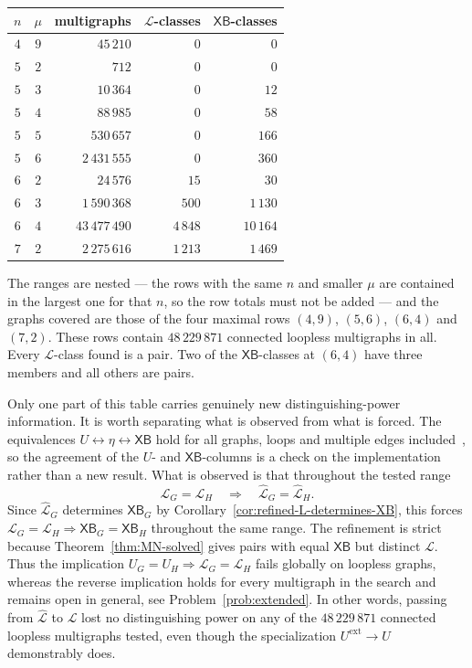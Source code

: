 \documentclass[11pt]{article}
\theoremstyle{plain}
\theoremstyle{definition}
\renewcommand{\mathcal}{\mathscr}
\newcommand{\LL}{\mathcal{L}}    %
\newcommand{\XB}{\mathsf{XB}} %
\newcommand{\ext}{\mathrm{ext}}
\numberwithin{equation}{section}
\begin{document}
\begin{center}
\begin{tabular}{ccrrr}
\toprule
$n$ & $\mu$ & multigraphs & $\LL$-classes & $\XB$-classes\\
\midrule
$4$    & $9$    & $45\,210$    & $0$   & $0$\\
$5$    & $2$    & $712$        & $0$   & $0$\\
$5$    & $3$    & $10\,364$    & $0$   & $12$\\
$5$    & $4$    & $88\,985$    & $0$   & $58$\\
$5$    & $5$    & $530\,657$   & $0$   & $166$\\
$5$    & $6$    & $2\,431\,555$& $0$   & $360$\\
$6$    & $2$    & $24\,576$    & $15$  & $30$\\
$6$    & $3$    & $1\,590\,368$& $500$ & $1\,130$\\
$6$    & $4$    & $43\,477\,490$& $4\,848$ & $10\,164$\\
$7$    & $2$    & $2\,275\,616$& $1\,213$ & $1\,469$\\
\bottomrule
\end{tabular}
\end{center}

The ranges are nested --- the rows with the same $n$ and smaller $\mu$ are
contained in the largest one for that $n$, so the row totals must not be
added --- and the graphs covered are those of the four maximal rows $(4,9)$, $(5,6)$, $(6,4)$ and $(7,2)$.
These rows contain $48\,229\,871$ connected loopless multigraphs in all.
Every $\LL$-class found is a pair.  Two of the
$\XB$-classes at $(6,4)$ have three members and all others are pairs.

Only one part of this table carries genuinely new distinguishing-power information.
It is worth separating what is observed from what is forced.  The equivalences
$U\leftrightarrow\eta\leftrightarrow \XB$ hold for all graphs, loops and
multiple edges included~\cite{NW,Sar,MN,Nob}, so the agreement of the $U$- and
$\XB$-columns is a check on the implementation rather than a new result.  What
is observed is that throughout the tested range
\[
   \LL_G=\LL_H
   \quad\Longrightarrow\quad
   \widehat{\LL}_G=\widehat{\LL}_H .
\]
Since $\widehat{\LL}_G$ determines $\XB_G$ by
Corollary~\ref{cor:refined-L-determines-XB}, this forces
$\LL_G=\LL_H\Rightarrow \XB_G=\XB_H$ throughout the same range.  The
refinement is strict because Theorem~\ref{thm:MN-solved} gives pairs with
equal $\XB$ but distinct $\LL$.  Thus the implication
$U_G=U_H\Rightarrow\LL_G=\LL_H$ fails globally on loopless graphs,
whereas the reverse implication holds for every multigraph in the search and
remains open in general, see Problem~\ref{prob:extended}.  In other words,
passing from $\widehat{\LL}$ to $\LL$ lost no distinguishing
power on any of the $48\,229\,871$ connected loopless multigraphs tested, even
though the specialization $U^{\ext}\to U$ demonstrably does.
\end{document}
